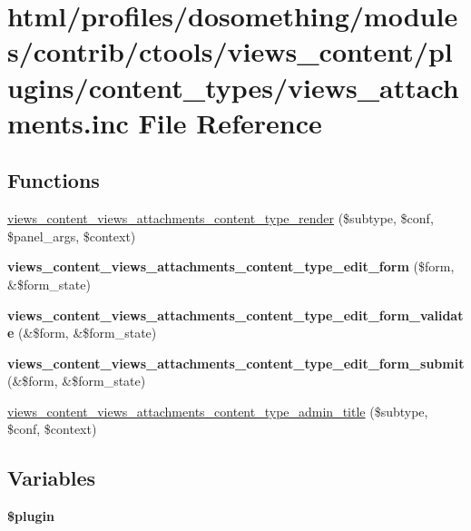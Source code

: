 \hypertarget{views__attachments_8inc}{
\section{html/profiles/dosomething/modules/contrib/ctools/views\_\-content/plugins/content\_\-types/views\_\-attachments.inc File Reference}
\label{views__attachments_8inc}
}
\subsection*{Functions}
\begin{DoxyCompactItemize}
\item 
\hyperlink{views__attachments_8inc_a5016c22df7090cb06e4ae47745479067}{views\_\-content\_\-views\_\-attachments\_\-content\_\-type\_\-render} (\$subtype, \$conf, \$panel\_\-args, \$context)
\item 
\hypertarget{views__attachments_8inc_ad84dbd2d7a47efff1eff47085b930fef}{
{\bfseries views\_\-content\_\-views\_\-attachments\_\-content\_\-type\_\-edit\_\-form} (\$form, \&\$form\_\-state)}
\label{views__attachments_8inc_ad84dbd2d7a47efff1eff47085b930fef}

\item 
\hypertarget{views__attachments_8inc_a48687a9b35ae54c3c865dbec2e839c47}{
{\bfseries views\_\-content\_\-views\_\-attachments\_\-content\_\-type\_\-edit\_\-form\_\-validate} (\&\$form, \&\$form\_\-state)}
\label{views__attachments_8inc_a48687a9b35ae54c3c865dbec2e839c47}

\item 
\hypertarget{views__attachments_8inc_a92760f52a689a99f405db2dae4469585}{
{\bfseries views\_\-content\_\-views\_\-attachments\_\-content\_\-type\_\-edit\_\-form\_\-submit} (\&\$form, \&\$form\_\-state)}
\label{views__attachments_8inc_a92760f52a689a99f405db2dae4469585}

\item 
\hyperlink{views__attachments_8inc_a51ae0ef08eb4eb0ab92f2b739baaddde}{views\_\-content\_\-views\_\-attachments\_\-content\_\-type\_\-admin\_\-title} (\$subtype, \$conf, \$context)
\end{DoxyCompactItemize}
\subsection*{Variables}
\begin{DoxyCompactItemize}
\item 
{\bfseries \$plugin}
\end{DoxyCompactItemize}


